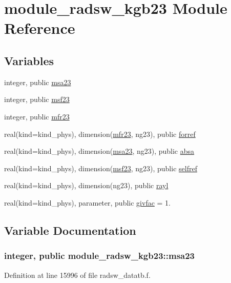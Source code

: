 \hypertarget{namespacemodule__radsw__kgb23}{}\section{module\+\_\+radsw\+\_\+kgb23 Module Reference}
\label{namespacemodule__radsw__kgb23}
\subsection*{Variables}
\begin{DoxyCompactItemize}
\item 
integer, public \hyperlink{namespacemodule__radsw__kgb23_a744e7ef73b8d3cc01ff9c6a6010d95d7}{msa23}
\item 
integer, public \hyperlink{group__module__radsw__main_gab96959c26232963a568609451483843e}{msf23}
\item 
integer, public \hyperlink{group__module__radsw__main_ga78b43ec4bc2afd4f520480a8410d9df5}{mfr23}
\item 
real(kind=kind\+\_\+phys), dimension(\hyperlink{group__module__radsw__main_ga78b43ec4bc2afd4f520480a8410d9df5}{mfr23}, ng23), public \hyperlink{group__module__radsw__main_ga18fabad311919ee30b2d367fbe250bcc}{forref}
\item 
real(kind=kind\+\_\+phys), dimension(\hyperlink{namespacemodule__radsw__kgb23_a744e7ef73b8d3cc01ff9c6a6010d95d7}{msa23}, ng23), public \hyperlink{group__module__radsw__main_ga2541e41c7d445a2ce73283e2fb76270c}{absa}
\item 
real(kind=kind\+\_\+phys), dimension(\hyperlink{group__module__radsw__main_gab96959c26232963a568609451483843e}{msf23}, ng23), public \hyperlink{group__module__radsw__main_gae4e51bcb3c3cbaaf1476d5ab18b072e5}{selfref}
\item 
real(kind=kind\+\_\+phys), dimension(ng23), public \hyperlink{group__module__radsw__main_ga40006f284543c7347eced417b9de2fc6}{rayl}
\item 
real(kind=kind\+\_\+phys), parameter, public \hyperlink{group__module__radsw__main_ga5f6ced06169db4b7470e20d5639ac54c}{givfac} = 1.
\end{DoxyCompactItemize}


\subsection{Variable Documentation}
\subsubsection[{\texorpdfstring{msa23}{msa23}}]{\setlength{\rightskip}{0pt plus 5cm}integer, public module\+\_\+radsw\+\_\+kgb23\+::msa23}\hypertarget{namespacemodule__radsw__kgb23_a744e7ef73b8d3cc01ff9c6a6010d95d7}{}\label{namespacemodule__radsw__kgb23_a744e7ef73b8d3cc01ff9c6a6010d95d7}


Definition at line 15996 of file radsw\+\_\+datatb.\+f.

